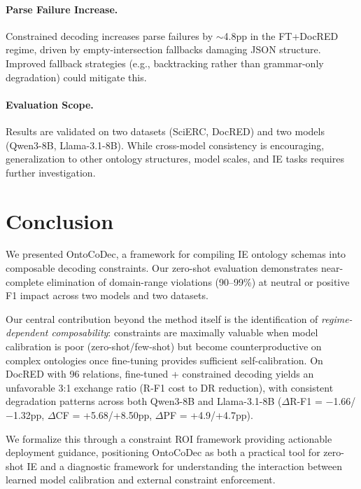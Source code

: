 \documentclass[11pt,a4paper]{article}
\newcommand{\system}{OntoCoDec}
\begin{document}
\paragraph{Parse Failure Increase.}
Constrained decoding increases parse failures by $\sim$4.8pp in the FT+DocRED regime, driven by empty-intersection fallbacks damaging JSON structure. Improved fallback strategies (e.g., backtracking rather than grammar-only degradation) could mitigate this.

\paragraph{Evaluation Scope.}
Results are validated on two datasets (SciERC, DocRED) and two models (Qwen3-8B, Llama-3.1-8B). While cross-model consistency is encouraging, generalization to other ontology structures, model scales, and IE tasks requires further investigation.

\section{Conclusion}

We presented \system{}, a framework for compiling IE ontology schemas into composable decoding constraints. Our zero-shot evaluation demonstrates near-complete elimination of domain-range violations (90--99\%) at neutral or positive F1 impact across two models and two datasets.

Our central contribution beyond the method itself is the identification of \emph{regime-dependent composability}: constraints are maximally valuable when model calibration is poor (zero-shot/few-shot) but become counterproductive on complex ontologies once fine-tuning provides sufficient self-calibration. On DocRED with 96 relations, fine-tuned + constrained decoding yields an unfavorable 3:1 exchange ratio (R-F1 cost to DR reduction), with consistent degradation patterns across both Qwen3-8B and Llama-3.1-8B ($\Delta$R-F1 = $-$1.66/$-$1.32pp, $\Delta$CF = +5.68/+8.50pp, $\Delta$PF = +4.9/+4.7pp).

We formalize this through a constraint ROI framework providing actionable deployment guidance, positioning \system{} as both a practical tool for zero-shot IE and a diagnostic framework for understanding the interaction between learned model calibration and external constraint enforcement.

\end{document}
